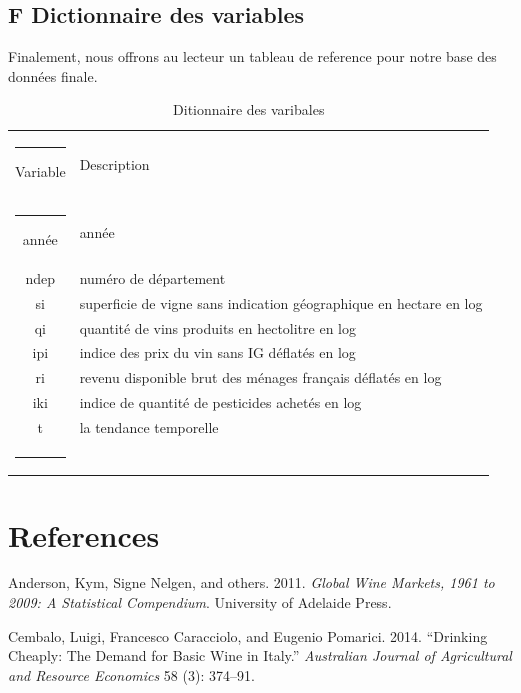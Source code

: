 \documentclass[11pt,]{article}
\begin{document}
\FloatBarrier

\newpage

\hypertarget{f-dictionnaire-des-variables}{%
\subsection{F Dictionnaire des
variables}\label{f-dictionnaire-des-variables}}

Finalement, nous offrons au lecteur un tableau de reference pour notre
base des données finale.

\FloatBarrier

\begin{table}[!htbp]
  \centering
\caption{Ditionnaire des varibales}
\begin{tabular}{c|l}
  \noindent\rule[0.5ex]{\linewidth}{1pt}
  Variable & Description \\
  \noindent\rule[0.5ex]{\linewidth}{1pt}
année & année \\
ndep & numéro de département \\
si & superficie de vigne sans indication géographique en hectare en log \\
qi & quantité de vins produits en hectolitre en log \\
ipi & indice des prix du vin sans IG déflatés en log  \\
ri & revenu disponible brut des ménages français déflatés en log \\
iki & indice de quantité de pesticides achetés en log \\
t & la tendance temporelle \\
\noindent\rule[0.5ex]{\linewidth}{1pt}
\end{tabular}
\end{table}

\FloatBarrier

\newpage

\hypertarget{references}{%
\section*{References}\label{references}}

\hypertarget{refs}{}
\leavevmode\hypertarget{ref-anderson2011global}{}%
Anderson, Kym, Signe Nelgen, and others. 2011. \emph{Global Wine
Markets, 1961 to 2009: A Statistical Compendium}. University of Adelaide
Press.

\leavevmode\hypertarget{ref-cembalo2014}{}%
Cembalo, Luigi, Francesco Caracciolo, and Eugenio Pomarici. 2014.
``Drinking Cheaply: The Demand for Basic Wine in Italy.''
\emph{Australian Journal of Agricultural and Resource Economics} 58 (3):
374--91.
\end{document}
